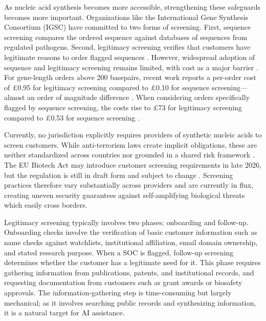 \documentclass[12pt]{article}
\begin{document}
As nucleic acid synthesis becomes more accessible, strengthening these safeguards becomes more important. Organizations like the International Gene Synthesis Consortium (IGSC) have committed to two forms of screening. First, sequence screening compares the ordered sequence against databases of sequences from regulated pathogens. Second, legitimacy screening verifies that customers have legitimate reasons to order flagged sequences \citep{IGSC2024}. However, widespread adoption of sequence and legitimacy screening remains limited, with cost as a major barrier \citep{Crawford2024}. For gene-length orders above 200 basepairs, recent work reports a per-order cost of £0.95 for legitimacy screening compared to £0.10 for sequence screening—almost an order of magnitude difference \citep{Fady2025annexes}. When considering orders specifically flagged by sequence screening, the costs rise to £73 for legitimacy screening compared to £0.53 for sequence screening \citep{Fady2025costmodel}.

Currently, no jurisdiction explicitly requires providers of synthetic nucleic acids to screen customers. While anti-terrorism laws create implicit obligations, these are neither standardized across countries nor grounded in a shared risk framework \citep{Wheeler2024}. The EU Biotech Act may introduce customer screening requirements in late 2026, but the regulation is still in draft form and subject to change \citep{EUBiotechAct2025}. Screening practices therefore vary substantially across providers and are currently in flux, creating uneven security guarantees against self-amplifying biological threats which easily cross borders.

Legitimacy screening typically involves two phases: onboarding and follow-up. Onboarding checks involve the verification of basic customer information such as name checks against watchlists, institutional affiliation, email domain ownership, and stated research purpose. When a SOC is flagged, follow-up screening determines whether the customer has a legitimate need for it. This phase requires gathering information from publications, patents, and institutional records, and requesting documentation from customers such as grant awards or biosafety approvals.
The information-gathering step is time-consuming but largely mechanical; as it involves searching public records and synthesizing information, it is a natural target for AI assistance.
\end{document}
